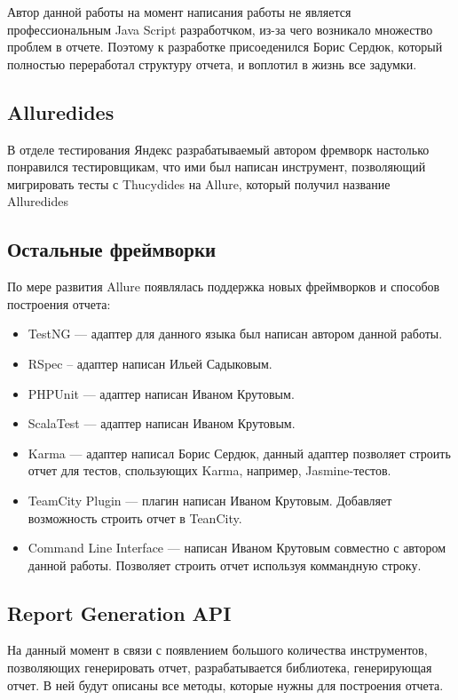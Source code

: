 Автор данной работы на момент написания работы не является профессиональным Java Script разработчком, из-за чего возникало множество проблем в отчете. Поэтому к разработке присоеденился Борис Сердюк, который полностью переработал структуру отчета, и воплотил в жизнь все задумки.

\subsection{Alluredides}

В отделе тестирования Яндекс разрабатываемый автором фремворк настолько понравился тестировщикам, что ими был написан инструмент, позволяющий мигрировать тесты с Thucydides на Allure, который получил название Alluredides

\subsection{Остальные фреймворки}

По мере развития Allure появлялась поддержка новых фреймворков и способов построения отчета:

\begin{itemize}
\item TestNG --- адаптер для данного языка был написан автором данной работы.
\item RSpec -- адаптер написан Ильей Садыковым.
\item PHPUnit --- адаптер написан Иваном Крутовым.
\item ScalaTest --- адаптер написан Иваном Крутовым.
\item Karma --- адаптер написал Борис Сердюк, данный адаптер позволяет строить отчет для тестов, спользующих Karma, например, Jasmine-тестов.
\item TeamCity Plugin --- плагин написан Иваном Крутовым. Добавляет возможность строить отчет в TeanCity.
\item Command Line Interface --- написан Иваном Крутовым совместно с автором данной работы. Позволяет строить отчет используя коммандную строку.
\end{itemize}

\subsection{Report Generation API}

На данный момент в связи с появлением большого количества инструментов, позволяющих генерировать отчет, разрабатывается библиотека, генерирующая отчет. В ней будут описаны все методы, которые нужны для построения отчета. 

